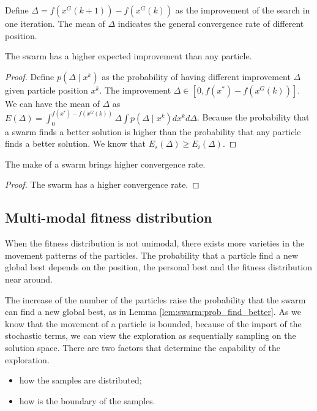 Define $ \Delta = f(x^{G}(k+1)) - f(x^{G}(k)) $ as the improvement of the search in one iteration.
The mean of $ \Delta $ indicates the general convergence rate of different position.

\begin{mylem}
\label{lem:swarm:higher_improve}
The swarm has a higher expected improvement than any particle.
\begin{proof}
Define $ p( \Delta \mid  x^{k} ) $ as the probability of having different improvement $ \Delta $ given particle position $ x^{k} $.
The improvement $ \Delta \in [0, f(x^{*}) - f(x^{G}(k))] $.
We can have the mean of $ \Delta $ as
$ E( \Delta ) =  \int_{0}^{ f(x^{*}) - f(x^{G}(k)) } \Delta \int p( \Delta \mid  x^{k} ) d  x^{k} d \Delta $.
Because the probability that a swarm finds a better solution is higher than the probability that any particle finds a better solution.
We know that $ E_{s} ( \Delta ) \geq E_{i} ( \Delta )  $.
\end{proof}
\end{mylem}

\begin{mythm}
\label{thm:swarm:higher_conv_rate}
The make of a swarm brings higher convergence rate.
\begin{proof}

The swarm has a higher convergence rate.
\end{proof}
\end{mythm}

\subsection{Multi-modal fitness distribution}

When the fitness distribution is not unimodal, there exists more varieties in the movement patterns of the particles.
The probability that a particle find a new global best depends on the position, the personal best and the fitness distribution near around.

The increase of the number of the particles raise the probability that the swarm can find a new global best, as in Lemma \ref{lem:swarm:prob_find_better}.
As we know that the movement of a particle is bounded, because of the import of the stochastic terms, we can view the exploration as sequentially sampling on the solution space.
There are two factors that determine the capability of the exploration.
\begin{itemize}
\item how the samples are distributed;
\item how is the boundary of the samples.
\end{itemize}

